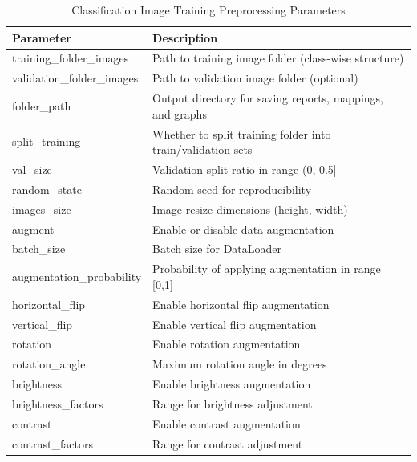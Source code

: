 \begin{table}[h!]
\centering
\begin{tabular}{|l|l|}
\hline
\textbf{Parameter} & \textbf{Description} \\
\hline

training\_folder\_images & Path to training image folder (class-wise structure) \\
validation\_folder\_images & Path to validation image folder (optional) \\
folder\_path & Output directory for saving reports, mappings, and graphs \\
split\_training & Whether to split training folder into train/validation sets \\
val\_size & Validation split ratio in range (0, 0.5] \\
random\_state & Random seed for reproducibility \\
images\_size & Image resize dimensions (height, width) \\
augment & Enable or disable data augmentation \\
batch\_size & Batch size for DataLoader \\
augmentation\_probability & Probability of applying augmentation in range [0,1] \\
horizontal\_flip & Enable horizontal flip augmentation \\
vertical\_flip & Enable vertical flip augmentation \\
rotation & Enable rotation augmentation \\
rotation\_angle & Maximum rotation angle in degrees \\
brightness & Enable brightness augmentation \\
brightness\_factors & Range for brightness adjustment \\
contrast & Enable contrast augmentation \\
contrast\_factors & Range for contrast adjustment \\

\hline
\end{tabular}
\caption{Classification Image Training Preprocessing Parameters}
\end{table}
